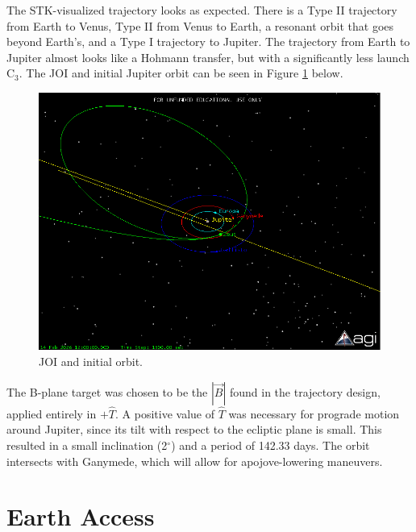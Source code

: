 \documentclass[]{aiaa-tc}%
\begin{document}
The STK-visualized trajectory looks as expected. There is a Type II trajectory from Earth to Venus, Type II from Venus to Earth, a resonant orbit that goes beyond Earth's, and a Type I trajectory to Jupiter. The trajectory from Earth to Jupiter almost looks like a Hohmann transfer, but with a significantly less launch C$_3$. The JOI and initial Jupiter orbit can be seen in Figure \ref{fig:JOI} below.

	\begin{figure}[H]
		\centering
			\includegraphics[width = 18cm]{../Figures/JOI_Initial_orb.png}
		\caption{JOI and initial orbit. }
		\label{fig:JOI}
	\end{figure}	

The B-plane target was chosen to be the $\left |{\vec{B}}  \right |$ found in the trajectory design, applied entirely in $+\hat{T}$. A positive value of $\hat{T}$ was necessary for prograde motion around Jupiter, since its tilt with respect to the ecliptic plane is small. This resulted in a small inclination (2$^\circ$) and a period of 142.33 days. The orbit intersects with Ganymede, which will allow for apojove-lowering maneuvers.

	\section{Earth Access}
\end{document}

